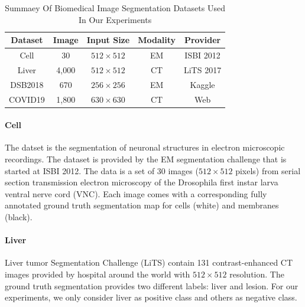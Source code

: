 \documentclass{ieeeaccess}
\begin{document}
  \begin{table}[htbp]
      \vspace{-2mm}
      \begin{center}\small
      \label{dataset-table}
      \begin{tabular}{ccccc}
        
      \toprule
      Dataset & Image & Input Size & Modality & Provider\\
      \midrule
      Cell & 30 & $512\times 512$  & EM      & ISBI 2012\cite{isbicell}   \\
      Liver    & 4,000 & $512\times 512$       & CT     & LiTS 2017\cite{liver}  \\
      DSB2018      & 670 & $256\times 256$      & EM      & Kaggle\cite{dsb2018} \\
      COVID19         & 1,800 & $630\times 630$     & CT     & Web\cite{covid19,covid19_2}  \\
    \bottomrule    
      \end{tabular}
      \caption{Summaey Of Biomedical Image Segmentation Datasets Used In Our Experiments}
    \end{center}
      \vspace{-4mm}
  \end{table}
    
  
  
  \paragraph{Cell}
  The datset is the segmentation of neuronal structures in electron microscopic recordings.
  The dataset is provided by the EM segmentation challenge\cite{isbicell} that is started at ISBI 2012.
  The data is a set of 30 images ($512\times 512$ pixels) from serial section transmission electron
  microscopy of the Drosophila first instar larva ventral nerve cord (VNC). Each image comes with a corresponding fully annotated ground truth segmentation
  map for cells (white) and membranes (black).
  
  \paragraph{Liver}
  Liver tumor Segmentation Challenge (LiTS)\cite{liver} contain 131 contrast-enhanced CT images provided by hospital around the world with \(512 \times 512\) resolution.
  The ground truth segmentation provides two different labels: liver and lesion. For our experiments,
  we only consider liver as positive class and others as negative class.
  
\end{document}
